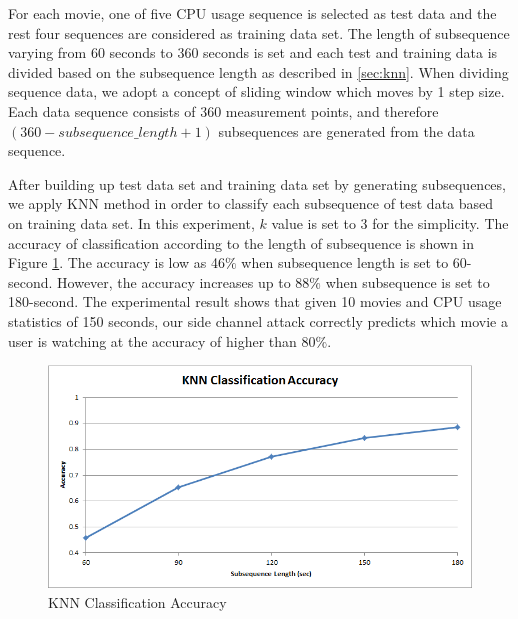 For each movie, one of five CPU usage sequence is selected as test data and the rest four sequences are considered as training data set. 
The length of subsequence varying from 60 seconds to 360 seconds is set and each test and training data is divided based on the subsequence length as described in \ref{sec:knn}.
When dividing sequence data, we adopt a concept of sliding window which moves by 1 step size.
Each data sequence consists of $360$ measurement points, and therefore $(360 - subsequence\_length + 1)$ subsequences are generated from the data sequence. 

After building up test data set and training data set by generating subsequences, we apply KNN method in order to classify each subsequence of test data based on training data set. 
In this experiment, $k$ value is set to 3 for the simplicity.
The accuracy of classification according to the length of subsequence is shown in Figure \ref{fig:experiment_knn}.
The accuracy is low as 46$\%$ when subsequence length is set to 60-second.
However, the accuracy increases up to 88$\%$ when subsequence is set to 180-second.
The experimental result shows that given 10 movies and CPU usage statistics of 150 seconds, our side channel attack correctly predicts which movie a user is watching at the accuracy of higher than 80$\%$.

\begin{figure}[!h]
\centering
\includegraphics[scale=0.50]{Figures/experiment_knn}
\caption{KNN Classification Accuracy}
\label{fig:experiment_knn}
\vspace{-5mm}
\end{figure}